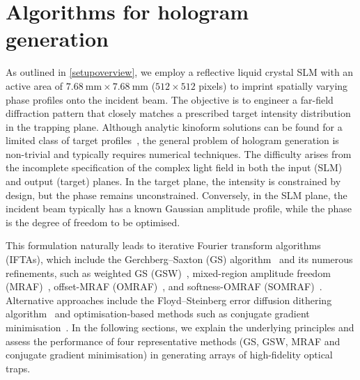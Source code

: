 \documentclass[../Thesis-IJspeert.tex]{subfiles}
\begin{document}
\section{Algorithms for hologram generation}
As outlined in \autoref{setupoverview}, we employ a reflective liquid crystal SLM with an active area of $\SI{7.68}{\milli\meter}\times\SI{7.68}{\milli\meter}$ ($\num{512}\times\num{512}$ pixels) to imprint spatially varying phase profiles onto the incident beam. The objective is to engineer a far-field diffraction pattern that closely matches a prescribed target intensity distribution in the trapping plane. Although analytic kinoform solutions can be found for a limited class of target profiles~\cite{Matsumoto2008,Moulder2012}, the general problem of hologram generation is non-trivial and typically requires numerical techniques. The difficulty arises from the incomplete specification of the complex light field in both the input (SLM) and output (target) planes. In the target plane, the intensity is constrained by design, but the phase remains unconstrained. Conversely, in the SLM plane, the incident beam typically has a known Gaussian amplitude profile, while the phase is the degree of freedom to be optimised.

This formulation naturally leads to iterative Fourier transform algorithms (IFTAs), which include the Gerchberg--Saxton (GS) algorithm~\cite{GS} and its numerous refinements, such as weighted GS (GSW)~\cite{DiLeonardo2007}, mixed-region amplitude freedom (MRAF)~\cite{Pasienski2008}, offset-MRAF (OMRAF)~\cite{Gaunt2012}, and softness-OMRAF (SOMRAF)~\cite{somraf}. Alternative approaches include the Floyd--Steinberg error diffusion dithering algorithm~\cite{floyd} and optimisation-based methods such as conjugate gradient minimisation~\cite{Harte2014}. In the following sections, we explain the underlying principles and assess the performance of four representative methods (GS, GSW, MRAF and conjugate gradient minimisation) in generating arrays of high-fidelity optical traps.
\end{document}
